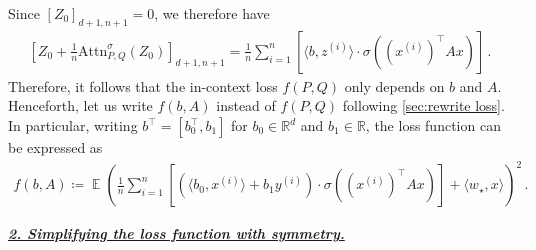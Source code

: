 \documentclass{article}
\DeclareMathOperator{\E}{\mathbb{E}}
\newcommand{\R}{\mathbb{R}}
\newcommand{\atth}{\mathrm{Attn}^\sigma}
\newcommand{\relu}{\sigma}
\newcommand{\bb}{A}
\newcommand{\cc}{b}
\newcommand{\wstar}{w_\star}
\newcommand{\tz}[1]{{z^{(#1)}}}
\newcommand{\tx}[1]{x^{(#1)}}
\newcommand{\ty}[1]{y^{(#1)}}
\newcommand{\emphh}[1]{\textbf{\emph{#1}}}
\newcommand{\inpp}[2]{ \langle #1,#2\rangle}
\begin{document}
Since $[Z_0]_{d+1,n+1}=0$, we therefore have 
\begin{align}
    \left[Z_{0} +\frac{1}{n} \atth_{P,Q}(Z_0) \right]_{d+1,n+1} = \frac{1}{n}\sum_{i=1}^n \left[ \inpp{\cc}{\tz{i}}\cdot \relu((\tx{i})^\top \bb x ) \right]\,.
\end{align}
Therefore, it follows that the in-context loss $f(P,Q)$ only depends on $\cc$ and $\bb$.
Henceforth, let us write $f(\cc,\bb)$ instead of $f(P,Q)$ following \autoref{sec:rewrite loss}. 
In particular, writing $\cc^\top = [\cc_0^\top ,\cc_1]$ for $\cc_0\in \R^d$ and $\cc_1\in \R$, the loss function can be expressed as 
\begin{align} \label{exp:nonlinear_loss}
    f(\cc,\bb) \coloneqq \E \left( \frac{1}{n}\sum_{i=1}^n \left[(\inpp{\cc_0}{\tx{i}}+ \cc_1 \ty{i})\cdot \relu((\tx{i})^\top \bb x ) \right] + \inpp{\wstar}{x}  \right)^2\,.
\end{align}






 \underline{\emphh{2. Simplifying the loss function with symmetry.}}
\end{document}
